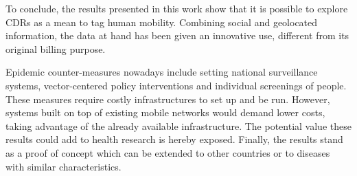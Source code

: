 To conclude, the results presented in this work show that it is possible to explore CDRs as a mean to tag human mobility.
Combining social and geolocated information, the data at hand has been given an innovative use, different from its original billing purpose.

Epidemic counter-measures nowadays include setting national surveillance systems, vector-centered policy interventions and individual screenings of people. These measures require costly infrastructures to set up and be run. However, systems built on top of existing mobile networks would demand lower costs, taking advantage of the already available infrastructure. The potential value these results could add to health research is hereby exposed.
Finally, the results stand as a proof of concept which can be extended to other countries or to diseases with similar characteristics.













